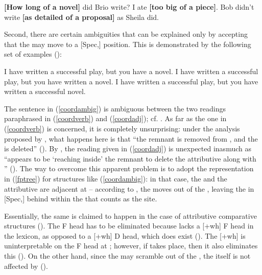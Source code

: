 \ea \label{brio4}
\ea \textbf{{[}How long of a novel]} did Brio write?
\ex I ate \textbf{[too big of a piece]}.
\ex Bob didn't write \textbf{[as detailed of a proposal]} as Sheila did.
\z
\z

Second, there are certain ambiguities that can be explained only by accepting that the  may move to a [Spec,] position. This is demonstrated by the following set of examples (\citealt[127, ex. 70]{kennedymerchant2000}):

\ea \label{coordkennedymerchant}
\ea I have written a successful play, but you have \underline{\hspace{0.5cm}} a novel. \label{coordambig}
\ex I have written a successful play, but you have written a novel. \label{coordverb}
\ex I have written a successful play, but you have written a successful novel. \label{coordadj}
\z
\z

The sentence in (\ref{coordambig}) is ambiguous between the two readings paraphrased in (\ref{coordverb}) and (\ref{coordadj}); cf. \citet[127]{kennedymerchant2000}. As far as the one in (\ref{coordverb}) is concerned, it is completely unsurprising: under the analysis proposed by \citet{kennedymerchant2000}, what happens here is that ``the remnant  is removed from , and the  is deleted'' (\citealt[128]{kennedymerchant2000}). By , the reading given in (\ref{coordadj}) is unexpected inasmuch as  ``appears to be `reaching inside' the remnant  to delete the attributive  along with '' (\citealt[128]{kennedymerchant2000}). The way to overcome this apparent problem is to adopt the representation in (\ref{fptree}) for structures like (\ref{coordambig}): in that case, the  and the attributive  are adjacent at  -- according to \citet[129--130]{kennedymerchant2000}, the  moves out of the , leaving the  in [Spec,] behind within the  that counts as the  site.

Essentially, the same is claimed to happen in the case of attributive comparative structures (\citealt[130--134]{kennedymerchant2000}). The F head has to be eliminated because  lacks a [+wh] F head in the lexicon, as opposed to a [+wh] D head, which does exist (\citealt[130]{kennedymerchant2000}). The [+wh]  is uninterpretable on the F head at ; however, if  takes place, then it also eliminates this  (\citealt[131]{kennedymerchant2000}). On the other hand, since the  may scramble out of the , the  itself is not affected by  (\citealt[131]{kennedymerchant2000}).

